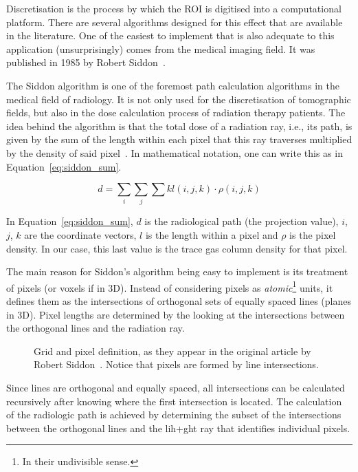 Discretisation is the process by which the \gls{ROI} is digitised into a
computational platform. There are several algorithms designed for this
effect that are available in the literature. One of the easiest to
implement that is also adequate to this application (unsurprisingly)
comes from the medical imaging field. It was published in 1985 by Robert
Siddon~\cite{Siddon1985}.

The Siddon algorithm is one of the foremost path calculation algorithms
in the medical field of radiology. It is not only used for the
discretisation of tomographic fields, but also in the dose calculation
process of radiation therapy patients. The idea behind the algorithm is
that the total dose of a radiation ray, i.e., its path, is given by the
sum of the length within each pixel that this ray traverses multiplied
by the density of said pixel~. In mathematical
notation, one can write this as in Equation~\ref{eq:siddon_sum}.

\begin{equation}
    \label{eq:siddon_sum}
    d = \sum_{i}\sum_{j}\sum{k} l(i, j, k)\cdot\rho(i, j, k)
\end{equation}

In Equation~\ref{eq:siddon_sum}, $d$ is the radiological path (the
projection value), $i$, $j$, $k$ are the coordinate vectors, $l$ is the
length within a pixel and $\rho$ is the pixel density. In our case, this
last value is the trace gas column density for that pixel.

The main reason for Siddon's algorithm being easy to implement is its
treatment of pixels (or voxels if in 3D). Instead of considering pixels
as \emph{atomic}\footnote{In their undivisible sense.} units, it defines
them as the intersections of orthogonal sets of equally spaced lines
(planes in 3D). Pixel lengths are determined by the looking at the
intersections between the orthogonal lines and the radiation ray. 

\begin{figure}[htpb]
    \centering
    \caption{Grid and pixel definition, as they appear in the original
        article by Robert Siddon~\cite{Siddon1985}. Notice that pixels are formed by line
        intersections.}
    \label{fig:siddon_pixels}
\end{figure}

Since lines are orthogonal and equally spaced, all intersections can be
calculated recursively after knowing where the first intersection is
located. The calculation of the radiologic path is achieved by
determining the subset of the intersections between the orthogonal lines
and the lih+ght ray that identifies individual pixels.

